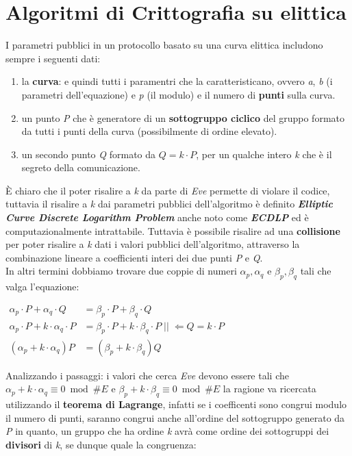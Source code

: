\chapter{Algoritmi di Crittografia su elittica}
I parametri pubblici in un protocollo basato su una curva elittica includono sempre i seguenti dati:
\begin{enumerate}
    \item la \textbf{curva}: e quindi tutti i paramentri che la caratteristicano, ovvero \textit{a}, \textit{b} (i parametri dell'equazione) e \textit{p} (il modulo) e il numero di \textbf{punti} sulla curva.
    \item un punto \textit{P} che è generatore di un \textbf{sottogruppo ciclico} del gruppo formato da tutti i punti della curva (possibilmente di ordine elevato).
    \item un secondo punto \textit{Q} formato da $Q = k \cdot P$, per un qualche intero \textit{k} che è il segreto della comunicazione. 
\end{enumerate}
È chiaro che il poter risalire a \textit{k} da parte di \textit{Eve} permette di violare il codice, tuttavia il risalire a \textit{k} dai parametri pubblici dell'algoritmo è definito \textbf{\textit{Elliptic Curve Discrete Logarithm Problem}} anche noto come \textbf{\textit{ECDLP}} ed è computazionalmente intrattabile. Tuttavia è possibile risalire ad una \textbf{collisione} per poter risalire a \textit{k} dati i valori pubblici dell'algoritmo, attraverso la combinazione lineare a coefficienti interi dei due punti \textit{P} e \textit{Q}. \\
In altri termini dobbiamo trovare due coppie di numeri $\alpha_p, \alpha_q \text{ e } \beta_p, \beta_q$ tali che valga l'equazione:
\begin{center}
    \begin{math}
        \begin{aligned}
            \alpha_p \cdot P + \alpha_q \cdot Q &= \beta_p \cdot P + \beta_q \cdot Q \\
            \alpha_p \cdot P + k \cdot \alpha_q \cdot P &= \beta_p \cdot P + k \cdot \beta_q \cdot P \; || \; \Leftarrow Q = k \cdot P \\
            (\alpha_p + k \cdot \alpha_q)P &= (\beta_p + k \cdot \beta_q)Q
        \end{aligned}
    \end{math}
\end{center}
Analizzando i passaggi: i valori che cerca \textit{Eve} devono essere tali che $\alpha_p + k \cdot \alpha_q \equiv 0 \bmod \#E$ e $\beta_p + k \cdot \beta_q \equiv 0 \bmod \#E$ la ragione va ricercata utilizzando il \textbf{teorema di Lagrange}, infatti se i coefficenti sono congrui modulo il numero di punti, saranno congrui anche all'ordine del sottogruppo generato da \textit{P} in quanto, un gruppo che ha ordine \textit{k} avrà come ordine dei sottogruppi dei \textbf{divisori} di \textit{k}, se dunque quale la congruenza:
